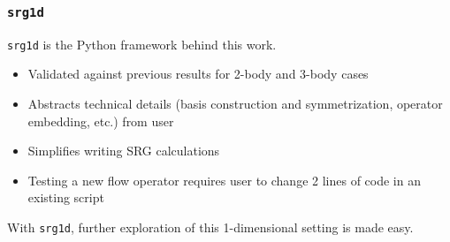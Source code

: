 \documentclass{beamer}
\begin{document}
{\begin{frame}
\pause
\begin{figure}
\begin{center}
\end{center}
\label{fig:heinz_newfull}
\end{figure}

\end{frame}

\begin{frame}
\frametitle{\texttt{srg1d}}
\texttt{srg1d} is the Python framework behind this work.
\begin{itemize}
    \item Validated against previous results for 2-body and 3-body cases
    \item Abstracts technical details (basis construction and symmetrization, operator embedding, etc.) from user
    \item Simplifies writing SRG calculations
    \item Testing a new flow operator requires user to change 2 lines of code in an existing script
\end{itemize}
\vspace{\baselineskip}
With \texttt{srg1d}, further exploration of this 1-dimensional setting is made easy.
\end{frame}

}
\end{document}
